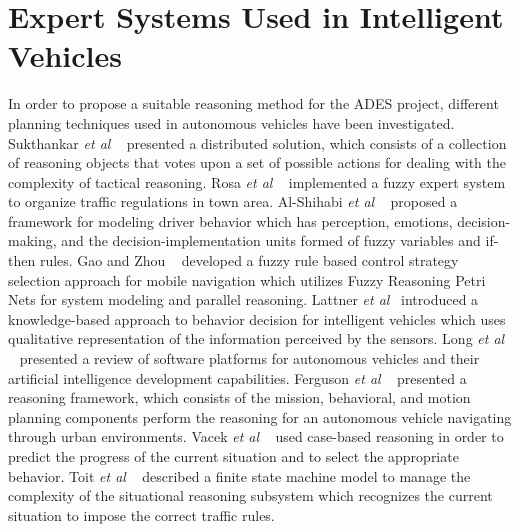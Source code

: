 \documentclass[a4paper,oneside,12pt]{report}
\begin{document}
\section{Expert Systems Used in Intelligent Vehicles}

In order to propose a suitable reasoning method for the ADES project, different planning techniques used in autonomous vehicles have been investigated. Sukthankar \textit{et al} ~\cite{sukthankar_distributed_1997} presented a distributed solution, which consists of a collection of reasoning objects that votes upon a set of possible actions for dealing with the complexity of tactical reasoning. Rosa \textit{et al} ~\cite{garcia_rosa_fuzzy_1997} implemented a fuzzy expert system to organize traffic regulations in town area. Al-Shihabi \textit{et al} ~\cite{al-shihabi_framework_2001} proposed a framework for modeling driver behavior which has perception, emotions, decision-making, and the decision-implementation units formed of fuzzy variables and if-then rules. Gao and Zhou ~\cite{gao_control_2005} developed a fuzzy rule based control strategy selection approach for mobile navigation which utilizes Fuzzy Reasoning Petri Nets for system modeling and parallel reasoning. Lattner \textit{et al}~\cite{lattner_knowledge-based_2005-1} introduced a knowledge-based approach to behavior decision for intelligent vehicles which uses qualitative representation of the information perceived by the sensors. Long \textit{et al} ~\cite{long_review_2007} presented a review of software platforms for autonomous vehicles and their artificial intelligence development capabilities. Ferguson \textit{et al} ~\cite{ferguson_reasoning_2008} presented a reasoning framework, which consists of the mission, behavioral, and motion planning components perform the reasoning for an autonomous vehicle navigating through urban environments. Vacek \textit{et al} ~\cite{vacek_situation_2007} used case-based reasoning in order to predict the progress of the current situation and to select the appropriate behavior. Toit \textit{et al} ~\cite{du_toit_situational_2008} described a finite state machine model to manage the complexity of the situational reasoning subsystem which recognizes the current situation to impose the correct traffic rules.
\end{document}
